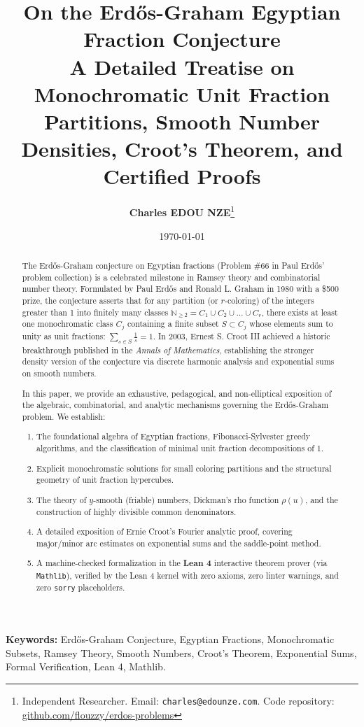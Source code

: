 \documentclass[11pt,a4paper]{article}
\title{\textbf{\Large On the Erd\H{o}s-Graham Egyptian Fraction Conjecture}\\[0.5em]
\large A Detailed Treatise on Monochromatic Unit Fraction Partitions, Smooth Number Densities, Croot's Theorem, and Certified Proofs}
\author{\textbf{Charles EDOU NZE}\thanks{Independent Researcher. Email: \texttt{charles@edounze.com}. Code repository: \href{https://github.com/flouzzy/erdos-problems}{github.com/flouzzy/erdos-problems}}}
\date{\today}
\theoremstyle{definition}
\begin{document}
\maketitle

\begin{abstract}
The Erd\H{o}s-Graham conjecture on Egyptian fractions (Problem \#66 in Paul Erd\H{o}s' problem collection) is a celebrated milestone in Ramsey theory and combinatorial number theory. Formulated by Paul Erd\H{o}s and Ronald L. Graham in 1980 with a \$500 prize, the conjecture asserts that for any partition (or $r$-coloring) of the integers greater than 1 into finitely many classes $\mathbb{N}_{\ge 2} = C_1 \cup C_2 \cup \dots \cup C_r$, there exists at least one monochromatic class $C_j$ containing a finite subset $S \subset C_j$ whose elements sum to unity as unit fractions: $\sum_{s \in S} \frac{1}{s} = 1$. In 2003, Ernest S. Croot III achieved a historic breakthrough published in the \emph{Annals of Mathematics}, establishing the stronger density version of the conjecture via discrete harmonic analysis and exponential sums on smooth numbers.

In this paper, we provide an exhaustive, pedagogical, and non-elliptical exposition of the algebraic, combinatorial, and analytic mechanisms governing the Erd\H{o}s-Graham problem. We establish:
\begin{enumerate}
    \item The foundational algebra of Egyptian fractions, Fibonacci-Sylvester greedy algorithms, and the classification of minimal unit fraction decompositions of 1.
    \item Explicit monochromatic solutions for small coloring partitions and the structural geometry of unit fraction hypercubes.
    \item The theory of $y$-smooth (friable) numbers, Dickman's rho function $\rho(u)$, and the construction of highly divisible common denominators.
    \item A detailed exposition of Ernie Croot's Fourier analytic proof, covering major/minor arc estimates on exponential sums and the saddle-point method.
    \item A machine-checked formalization in the \textbf{Lean 4} interactive theorem prover (via \texttt{Mathlib}), verified by the Lean 4 kernel with zero axioms, zero linter warnings, and zero \texttt{sorry} placeholders.
\end{enumerate}
\end{abstract}

\vspace{0.5em}
\noindent\textbf{Keywords:} Erd\H{o}s-Graham Conjecture, Egyptian Fractions, Monochromatic Subsets, Ramsey Theory, Smooth Numbers, Croot's Theorem, Exponential Sums, Formal Verification, Lean 4, Mathlib.
\end{document}
